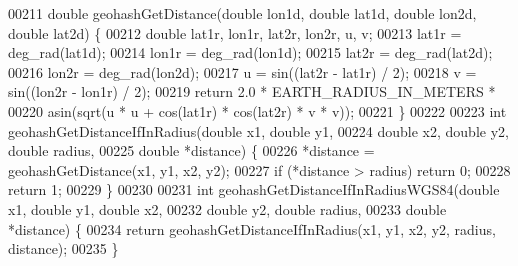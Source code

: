 \begin{DoxyCode}
00211 \textcolor{keywordtype}{double} geohashGetDistance(\textcolor{keywordtype}{double} lon1d, \textcolor{keywordtype}{double} lat1d, \textcolor{keywordtype}{double} lon2d, \textcolor{keywordtype}{double} lat2d) \{
00212     \textcolor{keywordtype}{double} lat1r, lon1r, lat2r, lon2r, u, v;
00213     lat1r = deg\_rad(lat1d);
00214     lon1r = deg\_rad(lon1d);
00215     lat2r = deg\_rad(lat2d);
00216     lon2r = deg\_rad(lon2d);
00217     u = sin((lat2r - lat1r) / 2);
00218     v = sin((lon2r - lon1r) / 2);
00219     \textcolor{keywordflow}{return} 2.0 * EARTH\_RADIUS\_IN\_METERS *
00220            asin(sqrt(u * u + cos(lat1r) * cos(lat2r) * v * v));
00221 \}
00222 
00223 \textcolor{keywordtype}{int} geohashGetDistanceIfInRadius(\textcolor{keywordtype}{double} x1, \textcolor{keywordtype}{double} y1,
00224                                  \textcolor{keywordtype}{double} x2, \textcolor{keywordtype}{double} y2, \textcolor{keywordtype}{double} radius,
00225                                  \textcolor{keywordtype}{double} *distance) \{
00226     *distance = geohashGetDistance(x1, y1, x2, y2);
00227     \textcolor{keywordflow}{if} (*distance > radius) \textcolor{keywordflow}{return} 0;
00228     \textcolor{keywordflow}{return} 1;
00229 \}
00230 
00231 \textcolor{keywordtype}{int} geohashGetDistanceIfInRadiusWGS84(\textcolor{keywordtype}{double} x1, \textcolor{keywordtype}{double} y1, \textcolor{keywordtype}{double} x2,
00232                                       \textcolor{keywordtype}{double} y2, \textcolor{keywordtype}{double} radius,
00233                                       \textcolor{keywordtype}{double} *distance) \{
00234     \textcolor{keywordflow}{return} geohashGetDistanceIfInRadius(x1, y1, x2, y2, radius, distance);
00235 \}
\end{DoxyCode}
